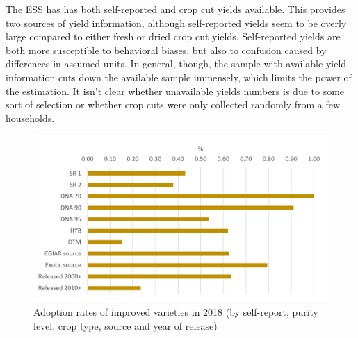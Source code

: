 \documentclass{article}
\begin{document}


The ESS has has both self-reported and crop cut yields available. This provides two sources of yield information, although self-reported yields seem to be overly large compared to either fresh or dried crop cut yields. Self-reported yields are both more susceptible to behavioral biases, but also to confusion caused by differences in assumed units. In general, though, the sample with available yield information cuts down the available sample immensely, which limits the power of the estimation. It isn't clear whether unavailable yields numbers is due to some sort of selection or whether crop cuts were only collected randomly from a few households.

\begin{figure}
    \centering
    \includegraphics{results/figures/adoption_r4.png}
    \caption{Adoption rates of improved varieties in 2018 (by self-report, purity level, crop type, source and year of release)}
    \label{fig:adoption_r4}
\end{figure}
\end{document}
